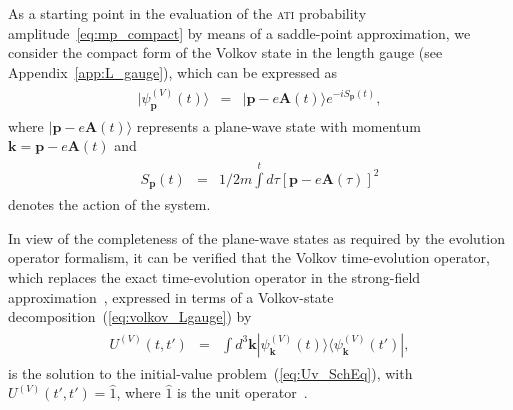 As a starting point in the evaluation of the \textsc{ati} probability
amplitude~\ref{eq:mp_compact} by means of a saddle-point
approximation, we consider the compact form of the Volkov state in the
length gauge (see Appendix~\ref{app:L_gauge}), which can be expressed
as~\cite{Becker_ati2002}
%
\begin{eqnarray}
\label{eq:volkov_Lgauge}
\begin{split}
|\psi_{\mathbf{p}}^{(V)}(t)\rangle & = &
|\mathbf{p} - e\mathbf{A}(t)\rangle e^{-i S_{\mathbf{p}}(t)},
\end{split}
\end{eqnarray}
%
where $|\mathbf{p} - e\mathbf{A}(t)\rangle$ represents a plane-wave
state with momentum $\mathbf{k} = \mathbf{p} - e\mathbf{A}(t)$ and
%
\begin{eqnarray}
  \begin{split}
    S_{\mathbf{p}}(t) & = & 1/2m \int\limits^{t} d\tau
    [\mathbf{p} - e \mathbf{A}(\tau)]^{2}
  \end{split}
  \label{eq:action_system}
\end{eqnarray}
%
denotes the action of the system.

In view of the completeness of the plane-wave states as required by
the evolution operator formalism, it can be verified that the Volkov
time-evolution operator, which replaces the exact time-evolution
operator in the strong-field approximation~\cite{KeldyshSFA},
expressed in terms of a Volkov-state
decomposition~(\ref{eq:volkov_Lgauge}) by
%
\begin{eqnarray}
\label{eq:te_volkov}
\begin{split}
U^{(V)}(t,t') & = & \int d^{3}\mathbf{k}
|\psi_{\mathbf{k}}^{(V)}(t) \rangle
\langle \psi_{\mathbf{k}}^{(V)}(t')|,
\end{split}
\end{eqnarray}
%
is the solution to the initial-value problem~(\ref{eq:Uv_SchEq}), with
$U^{(V)}(t',t') = \hat{1}$, where $\hat{1}$ is the unit
operator~\cite{BeckerTEOp_2006,cjp2010_keldysh}.

